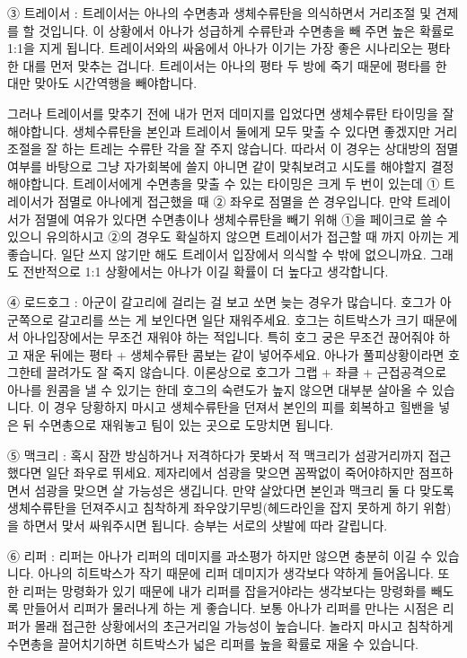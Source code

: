  

③ 트레이서 : 트레이서는 아나의 수면총과 생체수류탄을 의식하면서 거리조절 및 견제를 할 것입니다. 이 상황에서 아나가 성급하게 수류탄과 수면총을 빼 주면 높은 확률로 1:1을 지게 됩니다. 트레이서와의 싸움에서 아나가 이기는 가장 좋은 시나리오는 평타 한 대를 먼저 맞추는 겁니다. 트레이서는 아나의 평타 두 방에 죽기 때문에 평타를 한 대만 맞아도 시간역행을 빼야합니다.

 

그러나 트레이서를 맞추기 전에 내가 먼저 데미지를 입었다면 생체수류탄 타이밍을 잘 해야합니다. 생체수류탄을 본인과 트레이서 둘에게 모두 맞출 수 있다면 좋겠지만 거리조절을 잘 하는 트레는 수류탄 각을 잘 주지 않습니다. 따라서 이 경우는 상대방의 점멸 여부를 바탕으로 그냥 자가회복에 쓸지 아니면 같이 맞춰보려고 시도를 해야할지 결정해야합니다. 트레이서에게 수면총을 맞출 수 있는 타이밍은 크게 두 번이 있는데 ① 트레이서가 점멸로 아나에게 접근했을 때 ② 좌우로 점멸을 쓴 경우입니다. 만약 트레이서가 점멸에 여유가 있다면 수면총이나 생체수류탄을 빼기 위해 ①을 페이크로 쓸 수 있으니 유의하시고 ②의 경우도 확실하지 않으면 트레이서가 접근할 때 까지 아끼는 게 좋습니다. 일단 쓰지 않기만 해도 트레이서 입장에서 의식할 수 밖에 없으니까요. 그래도 전반적으로 1:1 상황에서는 아나가 이길 확률이 더 높다고 생각합니다.

 

④ 로드호그 : 아군이 갈고리에 걸리는 걸 보고 쏘면 늦는 경우가 많습니다. 호그가 아군쪽으로 갈고리를 쓰는 게 보인다면 일단 재워주세요. 호그는 히트박스가 크기 때문에서 아나입장에서는 무조건 재워야 하는 적입니다. 특히 호그 궁은 무조건 끊어줘야 하고 재운 뒤에는 평타 + 생체수류탄 콤보는 같이 넣어주세요. 아나가 풀피상황이라면 호그한테 끌려가도 잘 죽지 않습니다. 이론상으로 호그가 그랩 + 좌클 + 근접공격으로 아나를 원콤을 낼 수 있기는 한데 호그의 숙련도가 높지 않으면 대부분 살아올 수 있습니다. 이 경우 당황하지 마시고 생체수류탄을 던져서 본인의 피를 회복하고 힐밴을 넣은 뒤 수면총으로 재워놓고 팀이 있는 곳으로 도망치면 됩니다.

 

⑤ 맥크리 : 혹시 잠깐 방심하거나 저격하다가 못봐서 적 맥크리가 섬광거리까지 접근했다면 일단 좌우로 뛰세요. 제자리에서 섬광을 맞으면 꼼짝없이 죽어야하지만 점프하면서 섬광을 맞으면 살 가능성은 생깁니다. 만약 살았다면 본인과 맥크리 둘 다 맞도록 생체수류탄을 던져주시고 침착하게 좌우앉기무빙(헤드라인을 잡지 못하게 하기 위함)을 하면서 맞서 싸워주시면 됩니다. 승부는 서로의 샷발에 따라 갈립니다.

 

⑥ 리퍼 : 리퍼는 아나가 리퍼의 데미지를 과소평가 하지만 않으면 충분히 이길 수 있습니다. 아나의 히트박스가 작기 때문에 리퍼 데미지가 생각보다 약하게 들어옵니다. 또한 리퍼는 망령화가 있기 때문에 내가 리퍼를 잡을거야라는 생각보다는 망령화를 빼도록 만들어서 리퍼가 물러나게 하는 게 좋습니다. 보통 아나가 리퍼를 만나는 시점은 리퍼가 몰래 접근한 상황에서의 초근거리일 가능성이 높습니다. 놀라지 마시고 침착하게 수면총을 끌어치기하면 히트박스가 넓은 리퍼를 높을 확률로 재울 수 있습니다.

